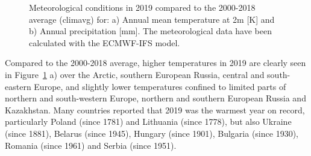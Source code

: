 \begin{figure}[h]
  \caption{Meteorological conditions in 2019 compared to the 2000-2018 average (climavg) for: a) Annual mean temperature at 2m [K] and b) Annual precipitation [mm]. The meteorological data have been calculated with the ECMWF-IFS model.}
\label{fig:metyear-avMET}
\end{figure}

Compared to the 2000-2018 average, higher temperatures in 2019 are clearly seen in Figure~\ref{fig:metyear-avMET} a) over the Arctic, southern European Russia, central and south-eastern Europe, and slightly lower temperatures confined to limited parts of northern and south-western Europe, northern and southern European Russia and Kazakhstan. 
Many countries reported that 2019 was the warmest year on record, particularly Poland (since 1781) and Lithuania (since 1778), but also Ukraine (since 1881), Belarus (since 1945), Hungary (since 1901), Bulgaria (since 1930), Romania (since 1961) and Serbia (since 1951).

